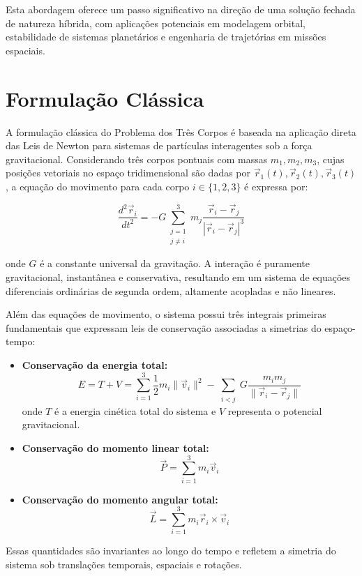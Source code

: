 \documentclass[12pt]{article}
\begin{document}
Esta abordagem oferece um passo significativo na direção de uma solução fechada de natureza híbrida, com aplicações potenciais em modelagem orbital, estabilidade de sistemas planetários e engenharia de trajetórias em missões espaciais.


\section{Formulação Clássica}

A formulação clássica do Problema dos Três Corpos é baseada na aplicação direta das Leis de Newton para sistemas de partículas interagentes sob a força gravitacional. Considerando três corpos pontuais com massas \( m_1, m_2, m_3 \), cujas posições vetoriais no espaço tridimensional são dadas por \( \vec{r}_1(t), \vec{r}_2(t), \vec{r}_3(t) \), a equação do movimento para cada corpo \( i \in \{1,2,3\} \) é expressa por:

\[
\frac{d^2 \vec{r}_i}{dt^2} = -G \sum_{\substack{j = 1 \\ j \ne i}}^{3} m_j \frac{\vec{r}_i - \vec{r}_j}{|\vec{r}_i - \vec{r}_j|^3}
\]

onde \( G \) é a constante universal da gravitação. A interação é puramente gravitacional, instantânea e conservativa, resultando em um sistema de equações diferenciais ordinárias de segunda ordem, altamente acopladas e não lineares.

Além das equações de movimento, o sistema possui três integrais primeiras fundamentais que expressam leis de conservação associadas a simetrias do espaço-tempo:

\begin{itemize}
    \item \textbf{Conservação da energia total:}
    \[
    E = T + V = \sum_{i=1}^{3} \frac{1}{2} m_i \|\vec{v}_i\|^2 - \sum_{\substack{i<j}} G \frac{m_i m_j}{\|\vec{r}_i - \vec{r}_j\|}
    \]
    onde \( T \) é a energia cinética total do sistema e \( V \) representa o potencial gravitacional.

    \item \textbf{Conservação do momento linear total:}
    \[
    \vec{P} = \sum_{i=1}^{3} m_i \vec{v}_i
    \]

    \item \textbf{Conservação do momento angular total:}
    \[
    \vec{L} = \sum_{i=1}^{3} m_i \vec{r}_i \times \vec{v}_i
    \]
\end{itemize}

Essas quantidades são invariantes ao longo do tempo e refletem a simetria do sistema sob translações temporais, espaciais e rotações.
\end{document}
